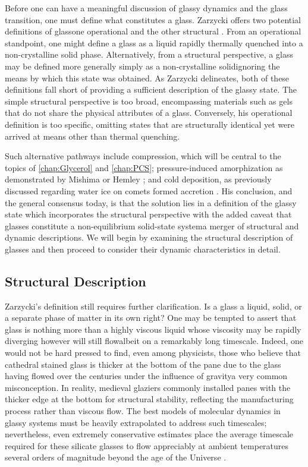 Before one can have a meaningful discussion of glassy dynamics and the glass transition, one must define what constitutes a glass.  Zarzycki offers two potential definitions of glass\textemdash one operational and the other structural \nolinebreak \cite{Zarzycki}.  From an operational standpoint, one might define a glass as a liquid rapidly thermally quenched into a non-crystalline solid phase. Alternatively, from a structural perspective, a glass may be defined more generally simply as a non-crystalline solid\textemdash ignoring the means by which this state was obtained.  As Zarzycki delineates, both of these definitions fall short of providing a sufficient description of the glassy state. The simple structural perspective is too broad, encompassing materials such as gels that do not share the physical attributes of a glass. Conversely, his operational definition is too specific, omitting states that are structurally identical yet were arrived at \via means other than thermal quenching. 

Such alternative pathways include compression, which will be central to the topics of \chap \nolinebreak \ref{chap:Glycerol} and \nolinebreak \ref{chap:PCS}; pressure-induced amorphization as demonstrated by Mishima or Hemley \etal \nolinebreak \cite{Hemley,Mishima}; and cold deposition, as previously discussed regarding water ice on comets formed \via accretion \nolinebreak \cite{Debenedetti2}.  His conclusion, and the general consensus today, is that the solution lies in a definition of the glassy state which incorporates the structural perspective with the added caveat that glasses constitute a non-equilibrium solid-state system\textemdash a merger of structural and dynamic descriptions.  We will begin by examining the structural description of glasses and then proceed to consider their dynamic characteristics in detail.

\subsection{Structural Description}\label{sec:sctructualdesc}

Zarzycki's definition still requires further clarification.  Is a glass a liquid, solid, or a separate phase of matter in its own right?  One may be tempted to assert that glass is nothing more than a highly viscous liquid whose viscosity may be rapidly diverging however will still flow\textemdash albeit on a remarkably long timescale.  Indeed, one would not be hard pressed to find, even among physicists, those who believe that cathedral stained glass is thicker at the bottom of the pane due to the glass having flowed over the centuries under the influence of gravity\textemdash a very common misconception. In reality, medieval glaziers commonly installed panes with the thicker edge at the bottom for structural stability, reflecting the manufacturing process rather than viscous flow. The best models of molecular dynamics in glassy systems must be heavily extrapolated to address such timescales; nevertheless, even extremely conservative estimates place the average timescale required for these silicate glasses to flow appreciably at ambient temperatures several orders of magnitude beyond the age of the Universe \nolinebreak \cite{Zanotto}. 

